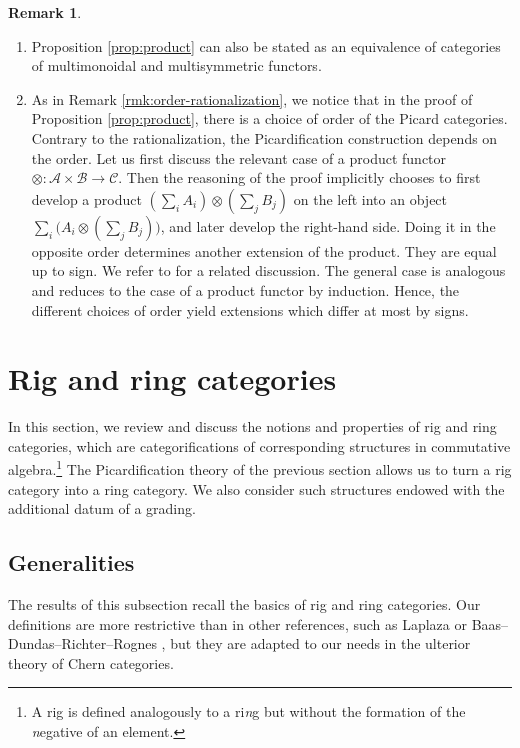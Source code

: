 \documentclass[JEP,XML,SOM,Unicode,published]{cedram}
\theoremstyle{plain}
\theoremstyle{definition}
\newtheorem{remark}[theorem]{Remark}
\newcommand{\Acal}{\mathcal A}
\newcommand{\Bcal}{\mathcal B}
\newcommand{\Ccal}{\mathcal C}
\begin{document}
\skpt
\begin{remark}\label{rem:orderdevelopproduct}
\begin{enumerate}
\item Proposition \ref{prop:product} can also be stated as an equivalence of categories of multimonoidal and multisymmetric functors.
\item\label{item:orderdevelopproduct-1} As in Remark \ref{rmk:order-rationalization}, we notice that in the proof of Proposition \ref{prop:product}, there is a choice of order of the Picard categories. Contrary to the rationalization, the Picardification construction depends on the order. Let us first discuss the relevant case of a product functor $\otimes\colon\Acal\times\Bcal\to\Ccal$. Then the reasoning of the proof implicitly chooses to first develop a product $(\sum_{i} A_i) \otimes (\sum_{j} B_j)$ on the left into an object $\sum_i \bigl(A_i \otimes(\sum_{j} B_j)\bigr)$, and later develop the right-hand side. Doing it in the opposite order determines another extension of the product. They are equal up to sign. We refer to \cite[]{Deligne-determinant} for a related discussion. The general case is analogous and reduces to the case of a product functor by induction. Hence, the different choices of order yield extensions which differ at most by signs.
\end{enumerate}
\end{remark}

\section{Rig and ring categories}\label{section:ring-categories}
In this section, we review and discuss the notions and properties of rig and ring categories, which are categorifications of corresponding structures in commutative algebra.\footnote{A rig is defined analogously to a ri\emph{n}g but without the formation of the \emph{n}egative of an element.} The Picardification theory of the previous section allows us to turn a rig category into a ring category. We also consider such structures endowed with the additional datum of a grading.

\subsection{Generalities}\label{subsec:rig-and-ring-categories}
The results of this subsection recall the basics of rig and ring categories. Our definitions are more restrictive than in other references, such as Laplaza \cite{Laplaza} or Baas--Dundas--Richter--Rognes \cite{BDRR}, but they are adapted to our needs in the ulterior theory of Chern categories.
\end{document}
